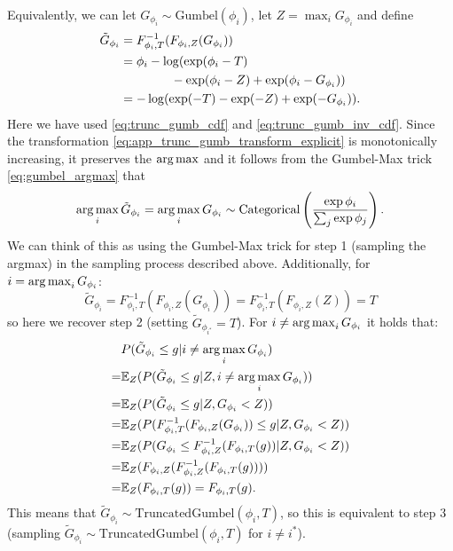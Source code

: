 Equivalently, we can let $G_{\phi_i} \sim \text{Gumbel}(\phi_i)$, let $Z = \max_i G_{\phi_i}$ and define
\begin{align}
    \tilde{G}_{\phi_i} &= F^{-1}_{\phi_i,T}(F_{\phi_i,Z}(G_{\phi_i})) \nonumber\\
    &= \phi_i - \log( \exp( \phi_i - T ) \nonumber \\
    &\phantom{{}=\phi_i \log (} - \exp (\phi_i - Z) + \exp (\phi_i - G_{\phi_i}) ) \notag \\
    &= - \log( \exp( - T ) - \exp ( - Z) + \exp ( - G_{\phi_i}) ). \label{eq:app_trunc_gumb_transform_explicit}
\end{align}
Here we have used \eqref{eq:trunc_gumb_cdf} and \eqref{eq:trunc_gumb_inv_cdf}. Since the transformation \eqref{eq:app_trunc_gumb_transform_explicit} is monotonically increasing, it preserves the $\operatorname*{arg\,max}$ and it follows from the Gumbel-Max trick \eqref{eq:gumbel_argmax} that 
\begin{equation*}
    \operatorname*{arg\,max}_i \tilde{G}_{\phi_i} = \operatorname*{arg\,max}_i G_{\phi_i} \sim \text{Categorical} \left( \frac{\exp{\phi_i}}{\sum_{j} \exp{\phi_j}} \right).
\end{equation*}
We can think of this as using the Gumbel-Max trick for step 1 (sampling the argmax) in the sampling process described above.
Additionally, for $i = \operatorname*{arg\,max}_i G_{\phi_i}$:
\begin{equation*}
    \tilde{G}_{\phi_{i}} = F^{-1}_{\phi_i,T}(F_{\phi_i,Z}(G_{\phi_i})) = F^{-1}_{\phi_i,T}(F_{\phi_i,Z}(Z)) = T
\end{equation*}
so here we recover step 2 (setting $\tilde{G}_{\phi_{i^*}} = T$). 
For $i \neq \operatorname*{arg\,max}_i G_{\phi_i}$ it holds that:
\begin{align*}
    &P(\tilde{G}_{\phi_i} \le g|i \neq \operatorname*{arg\,max}_i G_{\phi_i}) \\
    =& \mathbb{E}_Z(P(\tilde{G}_{\phi_i} \le g|Z, i \neq \operatorname*{arg\,max}_i G_{\phi_i})) \\
    =& \mathbb{E}_Z(P(\tilde{G}_{\phi_i} \le g|Z, G_{\phi_i} < Z)) \\
    =& \mathbb{E}_Z(P(F^{-1}_{\phi_i,T}(F_{\phi_i,Z}(G_{\phi_i})) \le g|Z, G_{\phi_i} < Z)) \\
    =& \mathbb{E}_Z(P(G_{\phi_i} \le F^{-1}_{\phi_i,Z}(F_{\phi_i,T}(g))|Z, G_{\phi_i} < Z)) \\
    =& \mathbb{E}_Z(F_{\phi_i,Z}(F^{-1}_{\phi_i,Z}(F_{\phi_i,T}(g)))) \\
    =& \mathbb{E}_Z(F_{\phi_i,T}(g)) = F_{\phi_i,T}(g).
\end{align*}
This means that $\tilde{G}_{\phi_i} \sim \text{TruncatedGumbel}(\phi_i, T)$, so this is equivalent to step 3 (sampling $\tilde{G}_{\phi_i} \sim \text{TruncatedGumbel}(\phi_i, T)$ for $i \neq i^*$).

